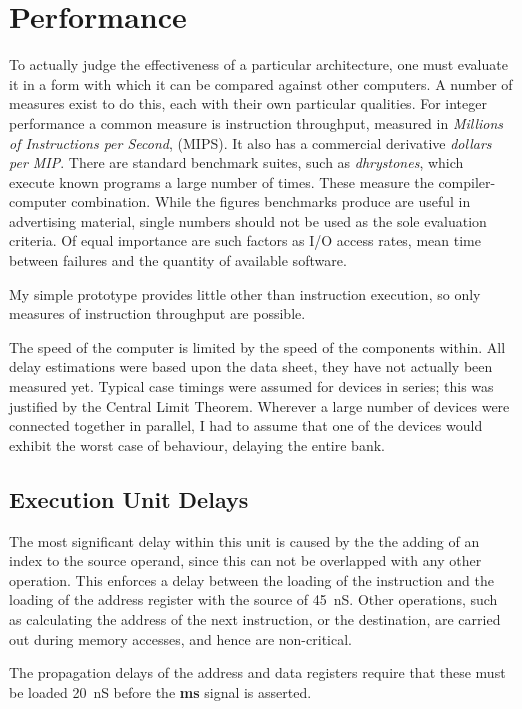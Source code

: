 \chapter{Performance}

To actually judge the effectiveness of a particular architecture, one must
evaluate it in a form  with which it can be compared against other computers.
A number of measures exist to do this, each with their own particular qualities. For integer performance  a common measure is instruction throughput, measured in  {\em Millions of Instructions per Second}, (MIPS).
It also has a commercial derivative   {\em dollars per MIP}.
There are  standard benchmark suites, such as {\em dhrystones}, which
execute known programs a large number of times. 
These measure the compiler-computer combination.
While the figures benchmarks produce are useful in advertising  material, single numbers should not be used as the sole evaluation criteria.
Of equal importance are such factors as I/O access rates, mean time between failures and the quantity of available software.

My simple prototype provides little other than instruction execution, so only measures of instruction throughput are possible.

The speed of the computer is  limited by the speed of the components within.
All delay estimations were based upon the data sheet, they have not actually been measured yet.
Typical case timings were assumed for  devices in series; this was justified by the Central Limit Theorem. 
Wherever a large number of devices were connected together in parallel, I had to assume that one of the devices would exhibit the worst case of behaviour, delaying the entire bank.


\section{Execution Unit Delays}
The most significant delay  within this unit is caused by the the adding of an index to the source operand, since this can not be overlapped with any other operation. This enforces a delay between the loading of the instruction and the loading of the address register with the source of 45~nS.
Other operations, such as calculating the address of the next instruction, or the destination, are carried out during memory accesses,  and hence are non-critical.

The propagation delays of the address and data registers require that these must be loaded 20~nS before the {\bf ms} signal is asserted.

